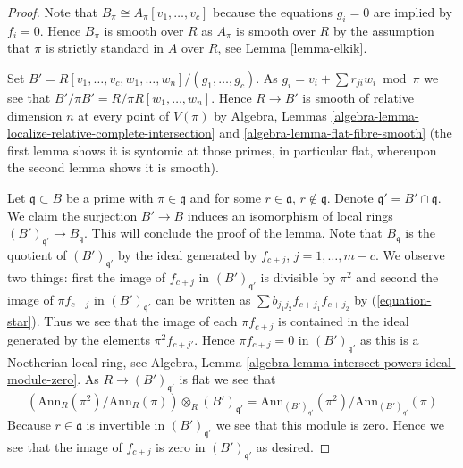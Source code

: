 \begin{proof}
\medskip\noindent
Note that $B_\pi \cong A_\pi[v_1, \ldots, v_c]$ because the equations
$g_i = 0$ are implied by $f_i = 0$. Hence $B_\pi$ is smooth over $R$
as $A_\pi$ is smooth over $R$ by the assumption that $\pi$ is strictly
standard in $A$ over $R$, see
Lemma \ref{lemma-elkik}.

\medskip\noindent
Set $B' = R[v_1, \ldots, v_c, w_1, \ldots, w_n]/(g_1, \ldots, g_c)$.
As $g_i = v_i + \sum r_{ji}w_i \bmod \pi$ we see that
$B'/\pi B' = R/\pi R[w_1, \ldots, w_n]$. Hence
$R \to B'$ is smooth of relative dimension $n$ at every
point of $V(\pi)$ by
Algebra, Lemmas
\ref{algebra-lemma-localize-relative-complete-intersection} and
\ref{algebra-lemma-flat-fibre-smooth}
(the first lemma shows it is syntomic at those primes, in particular
flat, whereupon the second lemma shows it is smooth).

\medskip\noindent
Let $\mathfrak q \subset B$ be a prime with $\pi \in \mathfrak q$ and
for some $r \in \mathfrak a$, $r \not \in \mathfrak q$.
Denote $\mathfrak q' = B' \cap \mathfrak q$.
We claim the surjection $B' \to B$ induces an isomorphism of local
rings $(B')_{\mathfrak q'} \to B_\mathfrak q$. This will
conclude the proof of the lemma. Note that $B_\mathfrak q$ is the
quotient of $(B')_{\mathfrak q'}$ by the ideal generated by
$f_{c + j}$, $j = 1, \ldots, m - c$. We observe two things:
first the image of $f_{c + j}$ in $(B')_{\mathfrak q'}$ is
divisible by $\pi^2$ and
second the image of $\pi f_{c + j}$ in $(B')_{\mathfrak q'}$
can be written as $\sum b_{j_1 j_2} f_{c + j_1}f_{c + j_2}$ by
(\ref{equation-star}). Thus we see that the image of each $\pi f_{c + j}$
is contained in the ideal generated by the elements $\pi^2 f_{c + j'}$.
Hence $\pi f_{c + j} = 0$ in $(B')_{\mathfrak q'}$ as this is a
Noetherian local ring, see
Algebra, Lemma \ref{algebra-lemma-intersect-powers-ideal-module-zero}.
As $R \to (B')_{\mathfrak q'}$ is flat we see that
$$
\left(\text{Ann}_R(\pi^2)/\text{Ann}_R(\pi)\right)
\otimes_R (B')_{\mathfrak q'}
=
\text{Ann}_{(B')_{\mathfrak q'}}(\pi^2)/\text{Ann}_{(B')_{\mathfrak q'}}(\pi)
$$
Because $r \in \mathfrak a$ is invertible in
$(B')_{\mathfrak q'}$ we see that this module is zero.
Hence we see that the image of $f_{c + j}$ is zero in
$(B')_{\mathfrak q'}$ as desired.
\end{proof}

